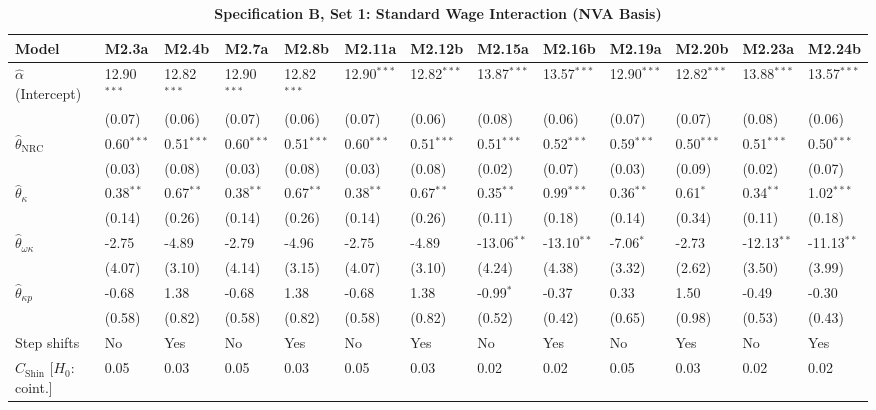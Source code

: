 \FloatBarrier
\begin{table}[h!]
\centering
\caption{\textbf{Specification B, Set 1: Standard Wage Interaction (NVA Basis)}}
\label{tab:specB_set1_nva_app}
\tiny
\setlength{\tabcolsep}{1.5pt}
\begin{tabular}{p{3.2cm}p{1.0cm}p{1.0cm}p{1.0cm}p{1.0cm}p{1.0cm}p{1.0cm}p{1.0cm}p{1.0cm}p{1.0cm}p{1.0cm}p{1.0cm}p{1.0cm}}
\toprule
Model & M2.3a & M2.4b & M2.7a & M2.8b & M2.11a & M2.12b & M2.15a & M2.16b & M2.19a & M2.20b & M2.23a & M2.24b \\
\midrule
$\hat{\alpha}$ (Intercept) & 12.90$^{***}$ & 12.82$^{***}$ & 12.90$^{***}$ & 12.82$^{***}$ & 12.90$^{***}$ & 12.82$^{***}$ & 13.87$^{***}$ & 13.57$^{***}$ & 12.90$^{***}$ & 12.82$^{***}$ & 13.88$^{***}$ & 13.57$^{***}$ \\
 & (0.07) & (0.06) & (0.07) & (0.06) & (0.07) & (0.06) & (0.08) & (0.06) & (0.07) & (0.07) & (0.08) & (0.06) \\
$\hat{\theta}_{\text{NRC}}$ & 0.60$^{***}$ & 0.51$^{***}$ & 0.60$^{***}$ & 0.51$^{***}$ & 0.60$^{***}$ & 0.51$^{***}$ & 0.51$^{***}$ & 0.52$^{***}$ & 0.59$^{***}$ & 0.50$^{***}$ & 0.51$^{***}$ & 0.50$^{***}$ \\
 & (0.03) & (0.08) & (0.03) & (0.08) & (0.03) & (0.08) & (0.02) & (0.07) & (0.03) & (0.09) & (0.02) & (0.07) \\
$\hat{\theta}_{\kappa}$ & 0.38$^{**}$ & 0.67$^{**}$ & 0.38$^{**}$ & 0.67$^{**}$ & 0.38$^{**}$ & 0.67$^{**}$ & 0.35$^{**}$ & 0.99$^{***}$ & 0.36$^{**}$ & 0.61$^{*}$ & 0.34$^{**}$ & 1.02$^{***}$ \\
 & (0.14) & (0.26) & (0.14) & (0.26) & (0.14) & (0.26) & (0.11) & (0.18) & (0.14) & (0.34) & (0.11) & (0.18) \\
$\hat{\theta}_{\omega\kappa}$ & -2.75 & -4.89 & -2.79 & -4.96 & -2.75 & -4.89 & -13.06$^{**}$ & -13.10$^{**}$ & -7.06$^{*}$ & -2.73 & -12.13$^{**}$ & -11.13$^{**}$ \\
 & (4.07) & (3.10) & (4.14) & (3.15) & (4.07) & (3.10) & (4.24) & (4.38) & (3.32) & (2.62) & (3.50) & (3.99) \\
$\hat{\theta}_{\kappa p}$ & -0.68 & 1.38 & -0.68 & 1.38 & -0.68 & 1.38 & -0.99$^{*}$ & -0.37 & 0.33 & 1.50 & -0.49 & -0.30 \\
 & (0.58) & (0.82) & (0.58) & (0.82) & (0.58) & (0.82) & (0.52) & (0.42) & (0.65) & (0.98) & (0.53) & (0.43) \\
\midrule
Step shifts & No & Yes & No & Yes & No & Yes & No & Yes & No & Yes & No & Yes \\
$C_{\text{Shin}}$ [$H_0$: coint.] & 0.05 & 0.03 & 0.05 & 0.03 & 0.05 & 0.03 & 0.02 & 0.02 & 0.05 & 0.03 & 0.02 & 0.02 \\

\end{tabular}
\end{table}
